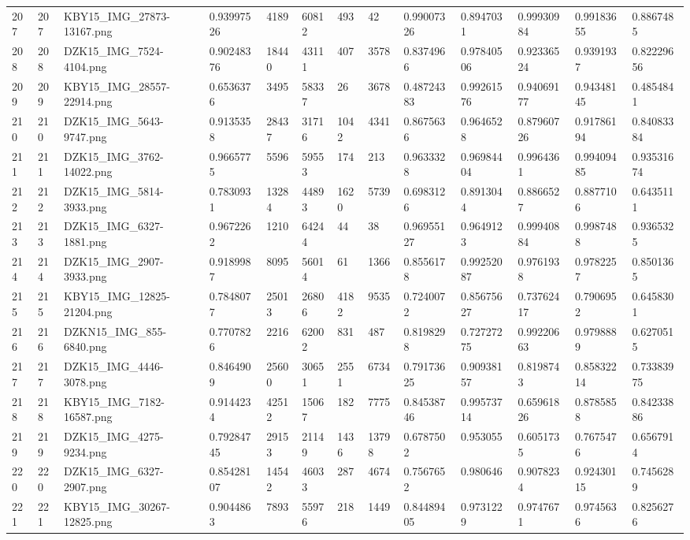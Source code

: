 \documentclass[11pt, a4paper, twoside]{report}
\begin{document}
\begin{longtable}[c]{@{}lllllllllllll@{}}
207 & 207 & KBY15\_IMG\_27873-13167.png & 0.93997526 & 4189 & 60812 & 493 & 42 & 0.99007326 & 0.8947031 & 0.99930984 & 0.99183655 & 0.8867485 \\
208 & 208 & DZK15\_IMG\_7524-4104.png & 0.90248376 & 18440 & 43111 & 407 & 3578 & 0.8374966 & 0.97840506 & 0.92336524 & 0.9391937 & 0.82229656 \\
209 & 209 & KBY15\_IMG\_28557-22914.png & 0.6536376 & 3495 & 58337 & 26 & 3678 & 0.48724383 & 0.99261576 & 0.94069177 & 0.94348145 & 0.4854841 \\
210 & 210 & DZK15\_IMG\_5643-9747.png & 0.9135358 & 28437 & 31716 & 1042 & 4341 & 0.8675636 & 0.9646528 & 0.87960726 & 0.91786194 & 0.84083384 \\
211 & 211 & DZK15\_IMG\_3762-14022.png & 0.9665775 & 5596 & 59553 & 174 & 213 & 0.9633328 & 0.96984404 & 0.9964361 & 0.99409485 & 0.93531674 \\
212 & 212 & DZK15\_IMG\_5814-3933.png & 0.7830931 & 13284 & 44893 & 1620 & 5739 & 0.6983126 & 0.8913044 & 0.8866527 & 0.8877106 & 0.6435111 \\
213 & 213 & DZK15\_IMG\_6327-1881.png & 0.9672262 & 1210 & 64244 & 44 & 38 & 0.96955127 & 0.9649123 & 0.99940884 & 0.9987488 & 0.9365325 \\
214 & 214 & DZK15\_IMG\_2907-3933.png & 0.9189987 & 8095 & 56014 & 61 & 1366 & 0.8556178 & 0.99252087 & 0.9761938 & 0.9782257 & 0.8501365 \\
215 & 215 & KBY15\_IMG\_12825-21204.png & 0.7848077 & 25013 & 26806 & 4182 & 9535 & 0.7240072 & 0.85675627 & 0.73762417 & 0.7906952 & 0.6458301 \\
216 & 216 & DZKN15\_IMG\_855-6840.png & 0.7707826 & 2216 & 62002 & 831 & 487 & 0.8198298 & 0.72727275 & 0.99220663 & 0.9798889 & 0.6270515 \\
217 & 217 & DZK15\_IMG\_4446-3078.png & 0.8464909 & 25600 & 30651 & 2551 & 6734 & 0.79173625 & 0.90938157 & 0.8198743 & 0.85832214 & 0.73383975 \\
218 & 218 & KBY15\_IMG\_7182-16587.png & 0.9144234 & 42512 & 15067 & 182 & 7775 & 0.84538746 & 0.99573714 & 0.65961826 & 0.8785858 & 0.84233886 \\
219 & 219 & DZK15\_IMG\_4275-9234.png & 0.79284745 & 29153 & 21149 & 1436 & 13798 & 0.6787502 & 0.953055 & 0.6051735 & 0.7675476 & 0.6567914 \\
220 & 220 & DZK15\_IMG\_6327-2907.png & 0.85428107 & 14542 & 46033 & 287 & 4674 & 0.7567652 & 0.980646 & 0.9078234 & 0.92430115 & 0.7456289 \\
221 & 221 & KBY15\_IMG\_30267-12825.png & 0.9044863 & 7893 & 55976 & 218 & 1449 & 0.84489405 & 0.9731229 & 0.9747671 & 0.9745636 & 0.8256276 \\

\end{longtable}
\end{document}
